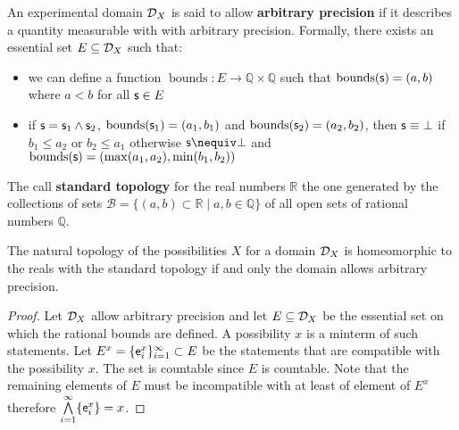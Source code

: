\documentclass[11pt,letterpaper,fleqn]{memoir} %
\begin{document}
\begin{mathSection}
	
	\begin{defn}
		An experimental domain $\edomain_X$ is said to allow \textbf{arbitrary precision} if it describes a quantity measurable with with arbitrary precision. Formally, there exists an essential set $E \subseteq \edomain_X$ such that:
		\begin{itemize}
			\item we can define a function $\operatorname{bounds} : E \to \mathbb{Q} \times \mathbb{Q}$ such that $\operatorname{bounds}(\stmt) = (a, b)$ where $a < b$ for all $\stmt \in E$
			\item if $\stmt = \stmt_1 \AND \stmt_2$, $\operatorname{bounds}(\stmt_1) = (a_1, b_1)$ and $\operatorname{bounds}(\stmt_2) = (a_2, b_2)$, then $\stmt \equiv \contradiction$ if $b_1 \leq a_2$ or $b_2 \leq a_1$ otherwise $\stmt \nequiv \contradiction$ and $\operatorname{bounds}(\stmt) = (\max(a_1, a_2), \min(b_1, b_2))$
		\end{itemize}
	\end{defn}
	
	\begin{defn}
		The call \textbf{standard topology} for the real numbers $\mathbb{R}$ the one generated by the collections of sets $\mathcal{B} = \{ (a,b) \subset \mathbb{R} \; | \; a,b \in \mathbb{Q} \}$ of all open sets of rational numbers $\mathbb{Q}$.
	\end{defn}
	
	\begin{thrm}
		The natural topology of the possibilities $X$ for a domain $\edomain_X$ is homeomorphic to the reals with the standard topology if and only the domain allows arbitrary precision.
	\end{thrm}
	\begin{proof}
		Let $\edomain_X$ allow arbitrary precision and let $E \subseteq \edomain_X$ be the essential set on which the rational bounds are defined. A possibility $x$ is a minterm of such statements. Let $E^x =\{\obs[e]^x_i\}_{i=1}^{\infty} \subset E$ be the statements that are compatible with the possibility $x$. The set is countable since $E$ is countable. Note that the remaining elements of $E$ must be incompatible with at least of element of $E^x$ therefore $\bigAND\limits_{i=1}^\infty\{\obs[e]^x_i\} = x$.
		

\end{proof}
\end{mathSection}
\end{document}
